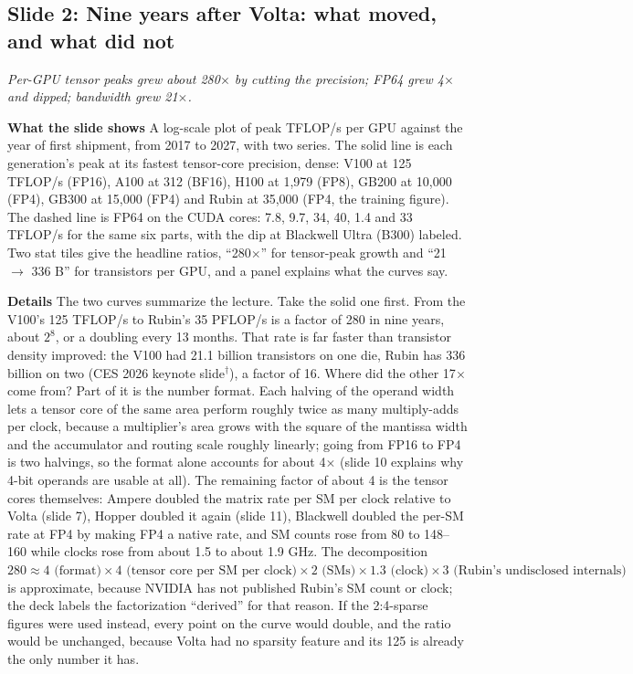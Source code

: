 \documentclass[11pt,letterpaper]{article}
\newcommand{\slide}[3]{%
  \subsection[Slide #1: #2]{Slide #1: #2}%
  {\color{muted}\itshape #3\par}\medskip}
\newcommand{\para}[1]{\medskip\noindent\textbf{#1}\quad}
\begin{document}
\slide{2}{Nine years after Volta: what moved, and what did not}{Per-GPU tensor peaks grew about 280$\times$ by cutting the precision; FP64 grew 4$\times$ and dipped; bandwidth grew 21$\times$.}

\para{What the slide shows} A log-scale plot of peak TFLOP/s per GPU against the year of first shipment, from 2017 to 2027, with two series. The solid line is each generation's peak at its fastest tensor-core precision, dense: V100 at 125 TFLOP/s (FP16), A100 at 312 (BF16), H100 at 1,979 (FP8), GB200 at 10,000 (FP4), GB300 at 15,000 (FP4) and Rubin at 35,000 (FP4, the training figure). The dashed line is FP64 on the CUDA cores: 7.8, 9.7, 34, 40, 1.4 and 33 TFLOP/s for the same six parts, with the dip at Blackwell Ultra (B300) labeled. Two stat tiles give the headline ratios, ``280$\times$'' for tensor-peak growth and ``21 $\to$ 336 B'' for transistors per GPU, and a panel explains what the curves say.

\para{Details} The two curves summarize the lecture. Take the solid one first. From the V100's 125 TFLOP/s to Rubin's 35 PFLOP/s is a factor of 280 in nine years, about $2^{8}$, or a doubling every 13 months. That rate is far faster than transistor density improved: the V100 had 21.1 billion transistors on one die, Rubin has 336 billion on two (CES 2026 keynote slide$^\dagger$), a factor of 16. Where did the other 17$\times$ come from? Part of it is the number format. Each halving of the operand width lets a tensor core of the same area perform roughly twice as many multiply-adds per clock, because a multiplier's area grows with the square of the mantissa width and the accumulator and routing scale roughly linearly; going from FP16 to FP4 is two halvings, so the format alone accounts for about 4$\times$ (slide 10 explains why 4-bit operands are usable at all). The remaining factor of about 4 is the tensor cores themselves: Ampere doubled the matrix rate per SM per clock relative to Volta (slide 7), Hopper doubled it again (slide 11), Blackwell doubled the per-SM rate at FP4 by making FP4 a native rate, and SM counts rose from 80 to 148--160 while clocks rose from about 1.5 to about 1.9 GHz. The decomposition $280 \approx 4 \text{ (format)} \times 4 \text{ (tensor core per SM per clock)} \times 2 \text{ (SMs)} \times 1.3 \text{ (clock)} \times 3 \text{ (Rubin's undisclosed internals)}$ is approximate, because NVIDIA has not published Rubin's SM count or clock; the deck labels the factorization ``derived'' for that reason. If the 2:4-sparse figures were used instead, every point on the curve would double, and the ratio would be unchanged, because Volta had no sparsity feature and its 125 is already the only number it has.
\end{document}
